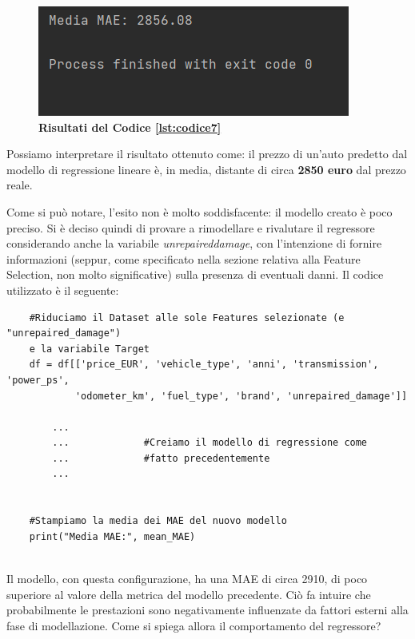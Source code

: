 \begin{figure}[H]
    \centering
    \includegraphics{Immagini/RisCodice7}
    \caption{\textbf{Risultati del Codice \ref{lst:codice7}}}
    \label{fig:RisCodice7}
\end{figure}
\pagebreak

Possiamo interpretare il risultato ottenuto come: il prezzo di un'auto predetto dal modello di regressione lineare è, in media, distante di circa \textbf{2850 euro} dal prezzo reale.

Come si può notare, l'esito non è molto soddisfacente: il modello creato è poco preciso. Si è deciso quindi di provare a rimodellare e rivalutare il regressore considerando anche la variabile \textit{unrepaired\textunderscore damage}, con l'intenzione di fornire informazioni (seppur, come specificato nella sezione relativa alla Feature Selection, non molto significative) sulla presenza di eventuali danni. Il codice utilizzato è il seguente:

    \begin{lstlisting}
    #Riduciamo il Dataset alle sole Features selezionate (e "unrepaired_damage")
    e la variabile Target
    df = df[['price_EUR', 'vehicle_type', 'anni', 'transmission', 'power_ps', 
            'odometer_km', 'fuel_type', 'brand', 'unrepaired_damage']]

        ...
        ...             #Creiamo il modello di regressione come
        ...             #fatto precedentemente
        ...

        
    #Stampiamo la media dei MAE del nuovo modello
    print("Media MAE:", mean_MAE)
    
    \end{lstlisting}
\medskip

Il modello, con questa configurazione, ha una MAE di circa 2910, di poco superiore al valore della metrica del modello precedente. Ciò fa intuire che probabilmente le prestazioni sono negativamente influenzate da fattori esterni alla fase di modellazione. Come si spiega allora il comportamento del regressore?
\medskip

